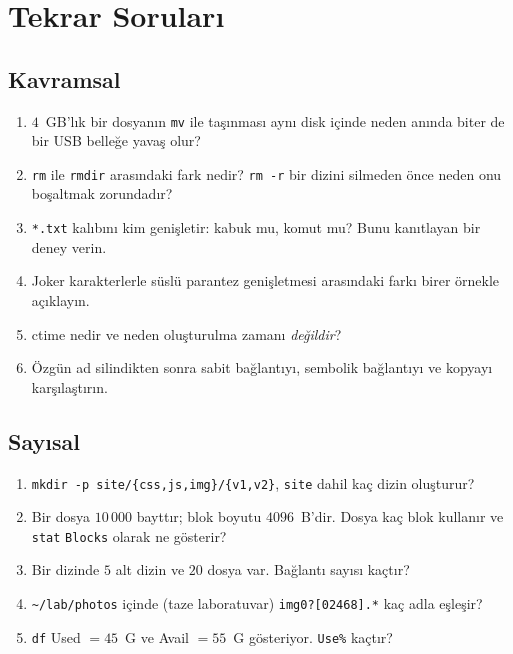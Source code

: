 \documentclass[11pt,a4paper]{article}
\newcommand{\cmd}[1]{\texttt{#1}}
\begin{document}
\section{Tekrar Soruları}

\subsection*{Kavramsal}
\begin{enumerate}[leftmargin=1.6em]
  \item $4$~GB'lık bir dosyanın \cmd{mv} ile taşınması aynı disk içinde neden anında biter de bir USB belleğe yavaş olur?
  \item \cmd{rm} ile \cmd{rmdir} arasındaki fark nedir? \cmd{rm -r} bir dizini silmeden önce neden onu boşaltmak zorundadır?
  \item \texttt{*.txt} kalıbını kim genişletir: kabuk mu, komut mu? Bunu kanıtlayan bir deney verin.
  \item Joker karakterlerle süslü parantez genişletmesi arasındaki farkı birer örnekle açıklayın.
  \item ctime nedir ve neden oluşturulma zamanı \emph{değildir}?
  \item Özgün ad silindikten sonra sabit bağlantıyı, sembolik bağlantıyı ve kopyayı karşılaştırın.
\end{enumerate}

\subsection*{Sayısal}
\begin{enumerate}[leftmargin=1.6em,resume]
  \item \cmd{mkdir -p site/\{css,js,img\}/\{v1,v2\}}, \texttt{site} dahil kaç dizin oluşturur?
  \item Bir dosya $10\,000$ bayttır; blok boyutu $4096$~B'dir. Dosya kaç blok kullanır ve \cmd{stat} \texttt{Blocks} olarak ne gösterir?
  \item Bir dizinde $5$ alt dizin ve $20$ dosya var. Bağlantı sayısı kaçtır?
  \item \texttt{\textasciitilde/lab/photos} içinde (taze laboratuvar) \texttt{img0?[02468].*} kaç adla eşleşir?
  \item \cmd{df} Used $= 45$~G ve Avail $= 55$~G gösteriyor. \texttt{Use\%} kaçtır?
\end{enumerate}
\end{document}
